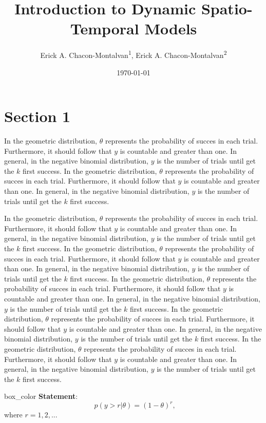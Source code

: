\documentclass[11pt, a4paper, top=4cm,bottom=3.5cm, right=3cm,left=3cm]{SimpleNotes}
\title{Introduction to Dynamic Spatio-Temporal Models}
\author{Erick A. Chacon-Montalvan\textsuperscript{1}, Erick A. Chacon-Montalvan\textsuperscript{2}}
\institute{\textsuperscript{1}\textit{CHICAS, Medical School, Lancaster University, Lancaster, United Kingdom}\\
\textsuperscript{2}\textit{CHICAS, Medical School, Lancaster University, Lancaster, United Kingdom}}
\date{\today}
\begin{document}
\maketitle

\section{Section 1}
In the geometric distribution, $\theta$ represents the probability of succes in each trial. Furthermore, it should follow that $y$ is countable and greater than one. In general, in the negative binomial distribution, $y$ is the number of trials until get the $k$ first success.
In the geometric distribution, $\theta$ represents the probability of succes in each trial. Furthermore, it should follow that $y$ is countable and greater than one. In general, in the negative binomial distribution, $y$ is the number of trials until get the $k$ first success.

In the geometric distribution, $\theta$ represents the probability of succes in each trial. Furthermore, it should follow that $y$ is countable and greater than one. In general, in the negative binomial distribution, $y$ is the number of trials until get the $k$ first success.
In the geometric distribution, $\theta$ represents the probability of succes in each trial. Furthermore, it should follow that $y$ is countable and greater than one. In general, in the negative binomial distribution, $y$ is the number of trials until get the $k$ first success.
In the geometric distribution, $\theta$ represents the probability of succes in each trial. Furthermore, it should follow that $y$ is countable and greater than one. In general, in the negative binomial distribution, $y$ is the number of trials until get the $k$ first success.
In the geometric distribution, $\theta$ represents the probability of succes in each trial. Furthermore, it should follow that $y$ is countable and greater than one. In general, in the negative binomial distribution, $y$ is the number of trials until get the $k$ first success.
In the geometric distribution, $\theta$ represents the probability of succes in each trial. Furthermore, it should follow that $y$ is countable and greater than one. In general, in the negative binomial distribution, $y$ is the number of trials until get the $k$ first success.

\begin{sframe}{box_color}
  \textbf{Statement}:\\
\begin{equation}
  \label{eq:bla}
~~p(y>r|\theta)=(1-\theta)^r,
\end{equation}
where $r = 1,2,...$
\end{sframe}
\end{document}
